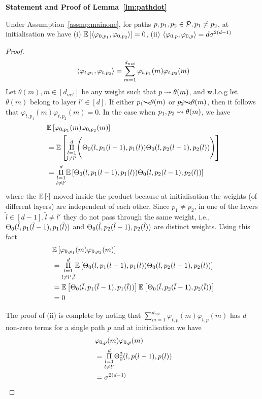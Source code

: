 \textbf{Statement and Proof of Lemma~\ref{lm:pathdot}}
\begin{lemma}
Under Assumption~\ref{assmp:mainone}, for paths $p,p_1,p_2\in \P, p_1\neq p_2$, at initialisation we have (i) $\E{\ip{\varphi_{0,p_1}, \varphi_{0,p_2}}}= 0$, (ii) ${\ip{\varphi_{0,p}, \varphi_{0,p}}}= d\sigma^{2(d-1)}$
\end{lemma}

\begin{proof}
\begin{align*}
\ip{\varphi_{t,p_1}, \varphi_{t,p_2}}= \sum_{m=1}^{d_{net}} \varphi_{t,p_1}(m)\varphi_{t,p_2}(m)
\end{align*}
Let $\theta(m),m\in[d_{net}]$ be any weight such that $p\rsa \theta(m)$, and w.l.o.g let $\theta(m)$ belong to layer $l'\in[d]$. 
If either $p_1\bcancel{\rsa}\theta(m)$ or $p_2\bcancel{\rsa}\theta(m)$, then it follows that $\varphi_{t,p_1}(m)\varphi_{t,p_2}(m)=0$. In the case when $p_1,p_2\rsa\theta(m)$, we have
\begin{align*}
&\E{\varphi_{0,p_1}(m)\varphi_{0,p_2}(m)}\\
&=\E{\underset{l\neq l'}{\underset{l=1}{\overset{d}{\Pi}}} \Bigg(\Tb_0(l,p_1(l-1),p_1(l))\Tb_0(l,p_2(l-1),p_2(l)) \Bigg)}\\
&=\underset{l\neq l'}{\underset{l=1}{\overset{d}{\Pi}}}\E{\Tb_0(l,p_1(l-1),p_1(l))\Tb_0(l,p_2(l-1),p_2(l))}
\end{align*}
where the $\E{\cdot}$ moved inside the product because at initialisation the weights (of different layers) are independent of each other.
Since $p_1\neq p_2$, in one of the layers $\tilde{l}\in[d-1],\tilde{l}\neq l'$ they do not pass through the same weight, i.e., $\Tb_0(\tilde{l},p_1(\tilde{l}-1),p_1(\tilde{l}))$ and $\Tb_0(\tilde{l},p_2(\tilde{l}-1),p_2(\tilde{l}))$ are distinct weights. Using this fact
\begin{align*}
&\E{\varphi_{0,p_1}(m)\varphi_{0,p_2}(m)}\\
&=\underset{l\neq l',\tilde{l}}{\underset{l=1}{\overset{d}{\Pi}}}\E{\Tb_0(l,p_1(l-1),p_1(l))\Tb_0(l,p_2(l-1),p_2(l))}\\
&=\E{\Tb_0(\tilde{l},p_1(\tilde{l}-1),p_1(\tilde{l}))}\E{\Tb_0(\tilde{l},p_2(\tilde{l}-1),p_2(\tilde{l}))}\\
&=0
\end{align*}

The proof of (ii) is complete by noting that $\sum_{m=1}^{d_{net}} \varphi_{t,p}(m)\varphi_{t,p}(m)$ has $d$ non-zero terms for a single path $p$ and at initialisation we have 
\begin{align*}
&{\varphi_{0,p}(m)\varphi_{0,p}(m)}\\
&={\underset{l\neq l'}{\underset{l=1}{\overset{d}{\Pi}}} \Tb^2_0(l,p(l-1),p(l))}\\
&=\sigma^{2(d-1)}
\end{align*}
\end{proof}

